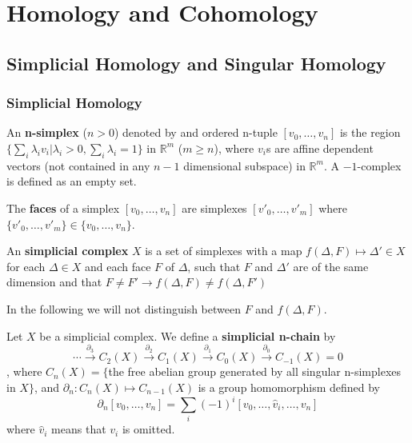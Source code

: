 \documentclass[12pt]{book}
\begin{document}
\part{Homology and Cohomology}
\chapter{Simplicial Homology and Singular Homology}
\section{Simplicial Homology}

\begin{definition}
	An {\bf n-simplex} ($n>0$) denoted by and ordered n-tuple $[v_0,\dots,v_n]$ is the region $\{\sum_i\lambda_iv_i|\lambda_i>0,\sum_i\lambda_i=1\}$ in $\mathbb R^m$ ($m\geq n$), where $v_i$s are affine dependent vectors (not contained in any $n-1$ dimensional subspace) in $\mathbb R^m$. A $-1$-complex is defined as an empty set.
\end{definition}

\begin{definition}
	The {\bf faces} of a simplex $[v_0,\dots,v_n]$ are simplexes $[v'_0,\dots,v'_m]$ where $\{v'_0,\dots,v'_m\}\in\{v_0,\dots,v_n\}$.
\end{definition}

\begin{definition}
	An {\bf simplicial complex} $X$ is a set of simplexes with a map $f(\Delta,F)\mapsto\Delta'\in X$ for each $\Delta\in X$ and each face $F$ of $\Delta$, such that $F$ and $\Delta'$ are of the same dimension and that $F\neq F'\rightarrow f(\Delta,F)\neq f(\Delta,F')$
\end{definition}

In the following we will not distinguish between $F$ and $f(\Delta,F)$.

\begin{definition}
	Let $X$ be a simplicial complex. We define a {\bf simplicial n-chain} by
	\begin{equation}
		\cdots\overset{\partial_3}\longrightarrow C_2(X)\overset{\partial_2}\longrightarrow C_1(X)\overset{\partial_1}\longrightarrow C_0(X)\overset{\partial_0}\longrightarrow C_{-1}(X)=0
	\end{equation}
	, where $C_n(X)=\{$the free abelian group generated by all singular n-simplexes in $X\}$, and $\partial_n:C_n(X)\mapsto C_{n-1}(X)$ is a group homomorphism defined by
	\begin{equation}
		\partial_n [v_0,\dots,v_n]=\sum_i(-1)^i [v_0,\dots,\hat v_i,\dots,v_n]
	\end{equation}
	where $\hat v_i$ means that $v_i$ is omitted.
\end{definition}
\end{document}
